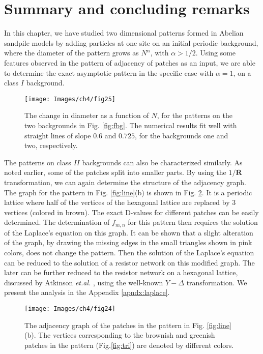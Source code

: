 \documentclass[11pt,a4paper]{book}
\begin{document}
\section{Summary and concluding remarks\label{sec:tropical}}
In this chapter, we have studied two dimensional patterns formed in
Abelian sandpile models by adding particles at one site on an initial
periodic background, where the diameter of the pattern grows as
$N^{\alpha}$, with $\alpha>1/2$. Using some features observed in the
pattern of adjacency of patches as an input, we are able to determine
the exact asymptotic pattern in the  specific case with $\alpha=1$, on
a class $I$ background.
\begin{figure}
\begin{center}
\texttt{[image: Images/ch4/fig25]}
\caption{The change in diameter as a function of $N$, for the patterns
on the two backgrounds in Fig. \ref{fig:fbg}. The numerical results fit well
with straight lines of slope $0.6$ and $0.725$, for the backgrounds one
and two, respectively.}
\label{fig:flinegrowth}
\end{center}
\end{figure}

The patterns on class $II$ backgrounds can also be characterized
similarly. As noted earlier, some of the patches split into smaller parts.
By using the $1/\overline{\mathbf{R}}$ transformation, we can again determine the structure of
the adjacency graph. The graph for the pattern in Fig.
\ref{fig:line}(b) is shown in Fig. \ref{fig:adjtwo}. It is a periodic
lattice where half of the vertices of the hexagonal lattice are
replaced by $3$
vertices (colored in brown). The exact D-values for different  patches can be easily
determined. The determination of $f_{m,n}$ for this pattern then
requires the solution of the Laplace's equation on this graph.
It can be shown that a slight alteration of the graph, by
drawing the missing edges in the small triangles shown in pink colors,
does not change the pattern. Then the solution of the Laplace's
equation can be reduced to the solution of a
resistor network on this modified graph. The later can be further
reduced to the resistor network on a
hexagonal lattice, discussed by Atkinson \textit{et.al.}
\cite{atkinson}, using the well-known $Y-\Delta$ transformation.
We present the analysis in the Appendix \ref{apndx:laplace}.
\begin{figure}[t]
\begin{center}
\texttt{[image: Images/ch4/fig24]}
\caption{The adjacency graph of the patches in the pattern in Fig.
\ref{fig:line}(b). The vertices corresponding to the brownish and greenish
patches in the pattern (Fig.\ref{fig:tri}) are denoted by different colors.}
\label{fig:adjtwo}
\end{center}
\end{figure}
\end{document}
